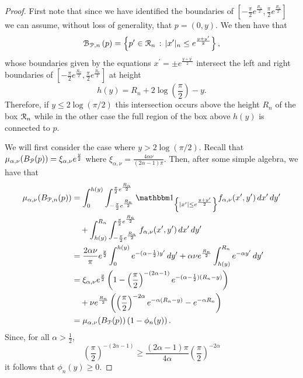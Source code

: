 \begin{proof}
First note that since we have identified the boundaries of $[-\frac{\pi}{2}e^{\frac{R_n}{2}}, \frac{\pi}{2}e^{\frac{R_n}{2}}]$ we can assume, without loss of generality, that $p = (0,y)$. We then have that
\[
	{\mathcal B}_{{\mathcal P},n}\left(p\right) = \left\{p^\prime \in {\mathcal R}_n \, : \, |x^\prime|_n \le e^{\frac{y + y^\prime}{2}}\right\},
\] 
whose boundaries given by the equations $x^\prime = \pm e^{\frac{y+y^\prime}{2}}$ intersect the left and right boundaries of $[-\frac{\pi}{2}e^{\frac{R_n}{2}}, \frac{\pi}{2}e^{\frac{R_n}{2}}]$ at height
\[
	h(y) = R_n + 2 \log\left(\frac{\pi}{2}\right) - y.
\]
Therefore, if $y \le 2 \log(\pi/2)$ this intersection occurs above the height $R_n$ of the box ${\mathcal R}_n$ while in the other case the full region of the box above $h(y)$ is connected to $p$. 

We will first consider the case where $y > 2 \log(\pi/2)$. Recall that $\mu_{\alpha,\nu}(B_{{\mathcal P}}(p)) = \xi_{\alpha,\nu}e^{\frac{y}{2}}$ where $\xi_{\alpha,\nu} = \frac{4\alpha \nu}{(2\alpha - 1)\pi}$. Then, after some simple algebra, we have that
\begin{align*}
	\mu_{\alpha,\nu}(B_{\Pcal,n}(p))
	&= \int_0^{h(y)} \int_{-\frac{\pi}{2}e^{\frac{R_n}{2}}}^{\frac{\pi}{2}e^{\frac{R_n}{2}}} 
		\ind{|x^\prime| \le e^{\frac{y+y^\prime}{2}}} f_{\alpha,\nu}(x^\prime,y^\prime) \, dx^\prime \, dy^\prime\\
	&\hspace{10pt}+ \int_{h(y)}^{R_n} \int_{-\frac{\pi}{2}e^{\frac{R_n}{2}}}^{\frac{\pi}{2}e^{\frac{R_n}{2}}} 
		f_{\alpha,\nu}(x^\prime,y^\prime) \, dx^\prime \, dy^\prime\\
	&= \frac{2 \alpha \nu}{\pi} e^{\frac{y}{2}} \int_0^{h(y)} e^{-(\alpha - \frac{1}{2})y^\prime} \, dy^\prime
		+ \alpha \nu e^{\frac{R_n}{2}} \int_{h(y)}^{R_n} e^{-\alpha y^\prime} \, dy^\prime \\
	&= \xi_{\alpha,\nu} e^{\frac{y}{2}}\left(1 - \left(\frac{\pi}{2}\right)^{-(2\alpha - 1)} 
		e^{-(\alpha - \frac{1}{2})(R_n - y)}\right)\\
	&\hspace{10pt}+ \nu e^{\frac{R_n}{2}}\left(\left(\frac{\pi}{2}\right)^{-2\alpha} e^{-\alpha(R_n - y)} 
		- e^{-\alpha R_n}\right)\\
	&= \mu_{\alpha,\nu}(B_\Pcal(p))\left(1 - \phi_n(y)\right).
\end{align*}
Since, for all $\alpha > \frac{1}{2}$,
\[
	\left(\frac{\pi}{2}\right)^{-(2\alpha - 1)} \ge \frac{(2\alpha - 1)\pi}{4\alpha} \left(\frac{\pi}{2}\right)^{-2\alpha}
\]
it follows that $\phi_n(y) \ge 0$.


\end{proof}
